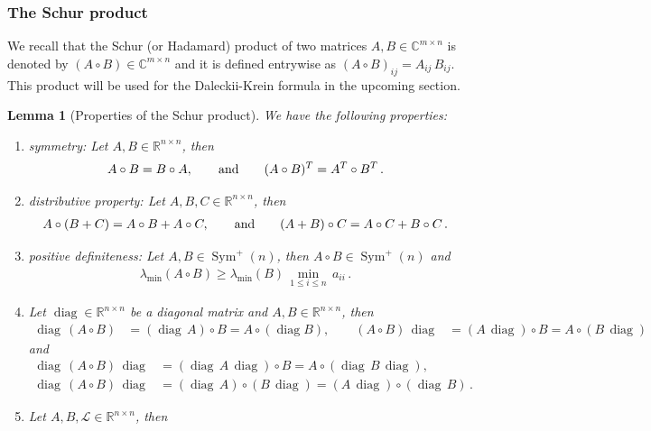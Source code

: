 \documentclass[10pt]{article}
\newcounter{theoremCounter}
\numberwithin{theoremCounter}{section}
\theoremstyle{plain}
\newtheorem{lem}[theoremCounter]{Lemma}
\theoremstyle{definition}
\newcommand{\R}{\mathbb{R}}
\DeclareMathOperator{\diag}{diag}
\DeclareMathOperator{\Sym}{Sym}
\def\C{\mathbb{C}}
\numberwithin{equation}{section}
\begin{document}
\begin{appendix}
\subsubsection{The Schur product}
%
We recall \cite{horn2013} that the Schur (or Hadamard) product of two matrices $A, B \in \C^{m \times n}$ is denoted by $(A \circ B) \in \C^{m \times n}$ and it is defined entrywise as $(A \circ B)_{ij} = A_{ij} \, B_{ij}$. This product will be used for the Daleckii-Krein formula in the upcoming section.
%
\begin{lem}[Properties of the Schur product]
We have the following properties:
	\begin{enumerate}
	\item symmetry: Let $A, B \in \R^{n \times n}$, then
		\begin{align}
		A \circ B = B \circ A, \qquad \textnormal{and} \qquad (A \circ B)^T = A^T \circ B^T \, .
		\end{align}
	\item distributive property: Let $A, B, C \in \R^{n \times n}$, then
		\begin{align}
		A \circ (B + C) = A \circ B + A \circ C, \qquad \textnormal{and} \qquad (A+B) \circ C = A \circ C + B \circ C \, .
		\end{align}
	\item positive definiteness: Let $A, B \in \Sym^+(n)$, then $A \circ B \in \Sym^+(n)$ and
		\begin{align}
		\lambda_{\min}(A \circ B) \ge \lambda_{\min}(B) \, \underset{1 \le i \le n}{\min} \, a_{ii} \, .
		\end{align}
	\item Let $\diag \in \R^{n \times n}$ be a diagonal matrix and $A, B \in \R^{n \times n}$, then
		\begin{equation}
		\begin{alignedat}{2}
		\diag \, (A \circ B) &= (\diag \, A) \circ B = A \circ (\diag B), \qquad (A \circ B) \, \diag &= (A \, \diag) \circ B = A \circ (B \, \diag) 
		\end{alignedat}
		\end{equation}
		and
		\begin{align}
		\diag \, (A \circ B) \, \diag &= (\diag \, A \, \diag) \circ B = A \circ (\diag \, B \, \diag), \\
		\diag \, (A \circ B) \, \diag &= (\diag \, A) \circ (B \, \diag) = (A \, \diag) \circ (\diag \, B) \, .
		\end{align}
	\item Let $A, B, \mathcal{L} \in \R^{n\times n}$, then

\end{enumerate}
\end{lem}
\end{appendix}
\end{document}
